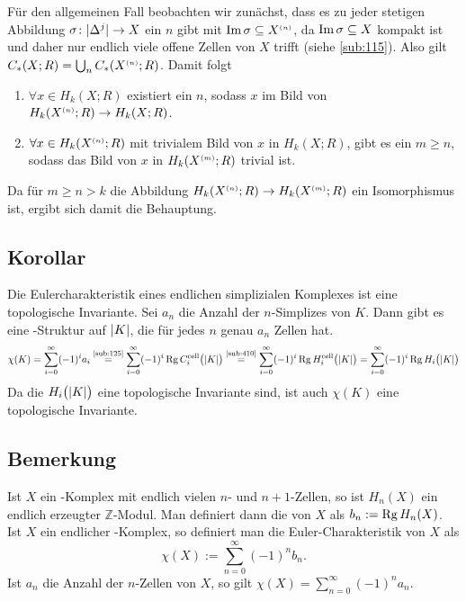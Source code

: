 \begin{enumerate}[a)]
	Für den allgemeinen Fall beobachten wir zunächst, dass es zu jeder stetigen Abbildung $\sigma\colon\abs{\Delta^j}\to X$ ein $n$ gibt mit 
	$\im \sigma \subseteq X^{\scriptscriptstyle(n)}$, da $\im \sigma \subseteq X$ kompakt ist und daher nur endlich viele offene Zellen von $X$ trifft (siehe \ref{sub:115}).
	Also gilt
	\(
		C_*(X;R) = \bigcup_n C_*(X^\ssbrace{n};R)
	\).
	Damit folgt \begin{enumerate}[(1)]
		\item $\forall x \in H_k(X;R) $ existiert ein $n$, sodass $x$ im Bild von $ H_k(X^\ssbrace{n};R) \to H_k(X;R)$.
		\item $\forall x\in H_k(X^\ssbrace{n};R)$ mit trivialem Bild von $x$ in $H_k(X;R)$, gibt es ein $m \ge n$, sodass das Bild von $x$ in $H_k(X^\ssbrace{m};R)$
		trivial ist.
	\end{enumerate}
	Da für $m \ge n >k$ die Abbildung $H_k(X^\ssbrace{n};R) \to H_k(X^\ssbrace{m};R)$ ein Isomorphismus ist, ergibt sich damit die Behauptung. \bewende 
\end{enumerate}

\subsection[Korollar: Die Eulercharakteristik ist eine topologische Invariante]{Korollar} %
\label{sub:1210}
Die Eulercharakteristik eines endlichen simplizialen Komplexes ist eine topologische Invariante.
Sei $a_n$ die Anzahl der $n$-Simplizes von $K$. Dann gibt es eine \CW-Struktur auf $\abs*{K}$, die für jedes $n$ genau $a_n$ Zellen hat.
\[
	\chi(K) = \sum_{i=0}^{\infty} (-1)^i a_i \stackrel{\mbox{\scriptsize\ref{sub:125}}}{=} \sum_{i=0}^{\infty} (-1)^i \Rg C_i^{\cell} \enbrace[\big]{\abs*{K}} 
	\stackrel{\mbox{\scriptsize\ref{sub:410}}}{=}
	\sum_{i=0}^{\infty} (-1)^i \Rg H_i^{\cell} \enbrace[\big]{\abs*{K}} = \sum_{i=0}^{\infty} (-1)^i \Rg H_i \enbrace[\big]{\abs*{K} }    
\]
Da die $H_i \enbrace[\big]{\abs*{K} } $ eine topologische Invariante sind, ist auch $\chi(K)$ eine topologische Invariante. \bewende

\subsection[Bemerkung: $n$-te Bettizahl und Eulercharakteristik eines \CW-Komplexes]{Bemerkung} %
\label{sub:1211}
Ist $X$ ein \CW-Komplex mit endlich vielen $n$- und $n+1$-Zellen, so ist $H_n(X)$ ein endlich erzeugter $\mathds{Z}$-Modul. Man definiert dann die  von $X$ als $b_n := \Rg H_n(X)$. Ist $X$ ein endlicher \CW-Komplex, so definiert man die Euler-Charakteristik von $X$ als
\[
	\chi(X) := \sum_{n=0}^{\infty} (-1)^{n} b_n.
\]
Ist $a_n$ die Anzahl der $n$-Zellen von $X$, so gilt $\chi(X)=\sum_{n=0}^{\infty} (-1)^n a_n$.

